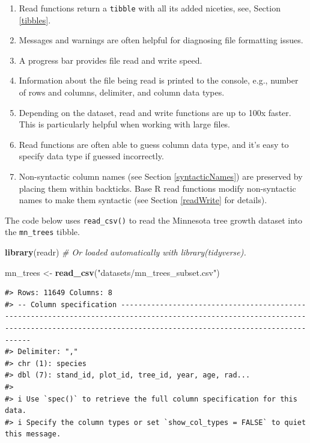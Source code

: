 \documentclass[
  11pt,
]{krantz}
\newenvironment{Shaded}{\begin{snugshade}}{\end{snugshade}}
\newcommand{\CommentTok}[1]{\textcolor[rgb]{0.56,0.35,0.01}{\textit{#1}}}
\newcommand{\KeywordTok}[1]{\textcolor[rgb]{0.13,0.29,0.53}{\textbf{#1}}}
\newcommand{\NormalTok}[1]{#1}
\newcommand{\StringTok}[1]{\textcolor[rgb]{0.31,0.60,0.02}{#1}}
\providecommand{\tightlist}{%
  \setlength{\itemsep}{0pt}\setlength{\parskip}{0pt}}
\theoremstyle{definition}
\theoremstyle{definition}
\theoremstyle{definition}
\theoremstyle{definition}
\theoremstyle{remark}
\begin{document}
\begin{enumerate}
\def\labelenumi{\arabic{enumi}.}
\tightlist
\item
  Read functions return a \texttt{tibble} with all its added niceties, see, Section \ref{tibbles}.
\item
  Messages and warnings are often helpful for diagnosing file formatting issues.
\item
  A progress bar provides file read and write speed.
\item
  Information about the file being read is printed to the console, e.g., number of rows and columns, delimiter, and column data types.
\item
  Depending on the dataset, read and write functions are up to 100x faster. This is particularly helpful when working with large files.
\item
  Read functions are often able to guess column data type, and it's easy to specify data type if guessed incorrectly.
\item
  Non-syntactic column names (see Section \ref{syntacticNames}) are preserved by placing them within backticks. Base R read functions modify non-syntactic names to make them syntactic (see Section \ref{readWrite} for details).
\end{enumerate}

The code below uses \texttt{read\_csv()} to read the Minnesota tree growth dataset into the \texttt{mn\_trees} tibble.

\begin{Shaded}
\begin{Highlighting}[]
\KeywordTok{library}\NormalTok{(readr) }\CommentTok{\# Or loaded automatically with library(tidyverse).}

\NormalTok{mn\_trees \textless{}{-}}\StringTok{ }\KeywordTok{read\_csv}\NormalTok{(}\StringTok{"datasets/mn\_trees\_subset.csv"}\NormalTok{)}
\end{Highlighting}
\end{Shaded}

\begin{verbatim}
#> Rows: 11649 Columns: 8
#> -- Column specification ---------------------------------------------------------------------------------------------------------------------------------------------------------------------------------------------
#> Delimiter: ","
#> chr (1): species
#> dbl (7): stand_id, plot_id, tree_id, year, age, rad...
#> 
#> i Use `spec()` to retrieve the full column specification for this data.
#> i Specify the column types or set `show_col_types = FALSE` to quiet this message.
\end{verbatim}
\end{document}
